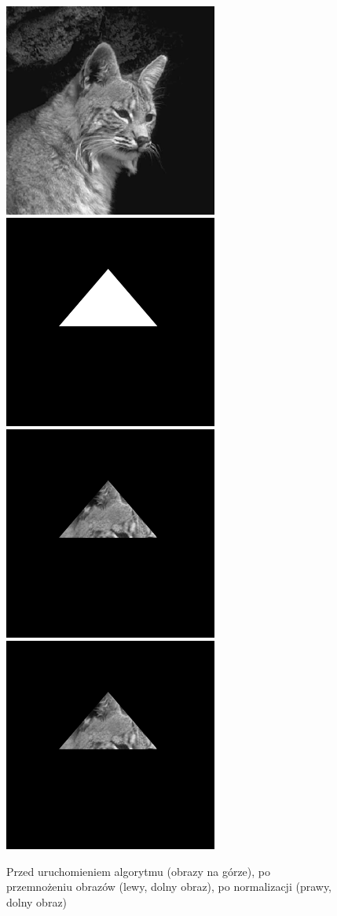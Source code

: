 \documentclass[a4paper,12pt]{book}
\begin{document}
\begin{figure}[H]
	\caption{Przed uruchomieniem algorytmu (obrazy na górze), po przemnożeniu obrazów (lewy, dolny obraz), po normalizacji (prawy, dolny obraz)}
	\includegraphics[width=7cm, height=7cm]{cat-unmodified.jpg}
	\includegraphics[width=7cm, height=7cm]{mask-unmodified.png}
	\includegraphics[width=7cm, height=7cm]{2/multiply-gray-images-mask.png}
	\includegraphics[width=7cm, height=7cm]{2/multiply-gray-images-mask.png}
\end{figure}
\end{document}
